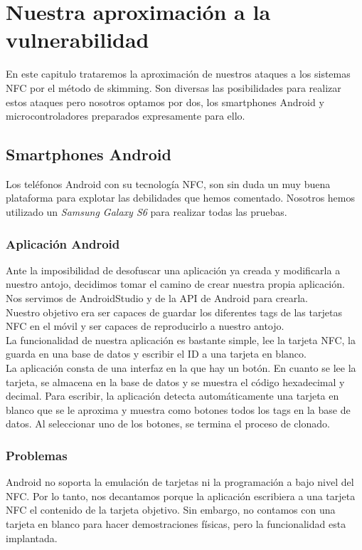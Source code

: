 \chapter{Nuestra aproximación a la vulnerabilidad}\label{ch:ataques}
En este capitulo trataremos la aproximación de nuestros ataques a los sistemas NFC por el método de skimming. Son diversas las posibilidades para realizar estos ataques pero nosotros optamos por dos, los smartphones Android y microcontroladores preparados expresamente para ello.
\clearpage

\section{Smartphones Android}
Los teléfonos Android con su tecnología NFC, son sin duda un muy buena plataforma para explotar las debilidades que hemos comentado. Nosotros hemos utilizado un \textit{Samsung Galaxy S6} para realizar todas las pruebas.

\subsection{Aplicación Android}
Ante la imposibilidad de desofuscar una aplicación ya creada y modificarla a nuestro antojo, decidimos tomar el camino de crear nuestra propia aplicación. Nos servimos de AndroidStudio y de la API de Android para crearla.\\
Nuestro objetivo era ser capaces de guardar los diferentes tags de las tarjetas NFC en el móvil y ser capaces de reproducirlo a nuestro antojo.\\
La funcionalidad de nuestra aplicación es bastante simple, lee la tarjeta NFC, la guarda en una base de datos y escribir el ID a una tarjeta en blanco.\\
La aplicación consta de una interfaz en la que hay un botón. En cuanto se lee la tarjeta, se almacena en la base de datos y se muestra el código hexadecimal y decimal. Para escribir, la aplicación detecta automáticamente una tarjeta en blanco que se le aproxima y muestra como botones todos los tags en la base de datos. Al seleccionar uno de los botones, se termina el proceso de clonado.

\subsection{Problemas}
Android no soporta la emulación de tarjetas ni la programación a bajo nivel del NFC. Por lo tanto, nos decantamos porque la aplicación escribiera a una tarjeta NFC el contenido de la tarjeta objetivo. Sin embargo, no contamos con una tarjeta en blanco para hacer demostraciones físicas, pero la funcionalidad esta implantada.
\newpage

